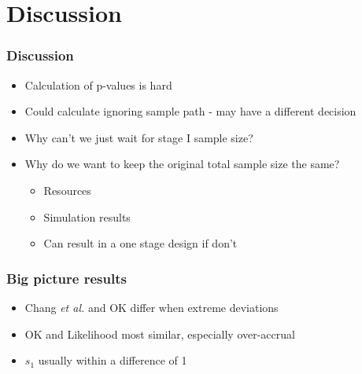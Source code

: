 \documentclass{beamer}\usepackage[]{graphicx}\usepackage[]{color}
\begin{document}
\section{Discussion}
\begin{frame}
\frametitle{Discussion}
    \begin{itemize}
        \item Calculation of p-values is hard
        \item Could calculate ignoring sample path - may have a different decision %
        \item Why can't we just wait for stage I sample size?
        \item Why do we want to keep the original total sample size the same?
          \begin{itemize}
            \item Resources
            \item Simulation results
            \item Can result in a one stage design if don't
          \end{itemize}
    \end{itemize}
\end{frame}

\begin{frame}
\frametitle{Big picture results}
    \begin{itemize}
        \item Chang \textit{et al.} and OK differ when extreme deviations
        \item OK and Likelihood most similar, especially over-accrual
        \item $s_1$ usually within a difference of 1
    \end{itemize}
\end{frame}
\end{document}
